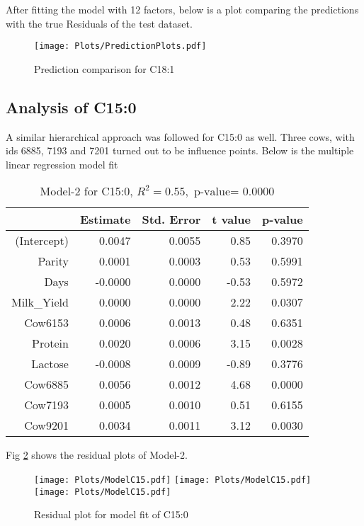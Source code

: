 After fitting the model with 12 factors, below is a plot comparing the predictions with the true Residuals of the test dataset.
\begin{figure}[H]
\begin{center}
\texttt{[image: Plots/PredictionPlots.pdf]}
\end{center}
\caption{Prediction comparison for C18:1}
\label{fig:plsr18}
\end{figure}

\subsection*{Analysis of C15:0}
A similar hierarchical approach was followed for C15:0 as well. Three cows, with ids 6885, 7193 and 7201 turned out to be influence points. Below is the multiple linear regression model fit
\begin{table}[H]
\centering
\begin{tabular}{rrrrr}
  \hline
 & Estimate & Std. Error & t value & p-value \\ 
  \hline
  (Intercept) & 0.0047 & 0.0055 & 0.85 & 0.3970 \\ 
  Parity & 0.0001 & 0.0003 & 0.53 & 0.5991 \\ 
  Days & -0.0000 & 0.0000 & -0.53 & 0.5972 \\ 
  Milk\_Yield & 0.0000 & 0.0000 & 2.22 & 0.0307 \\ 
  Cow6153 & 0.0006 & 0.0013 & 0.48 & 0.6351 \\ 
  Protein & 0.0020 & 0.0006 & 3.15 & 0.0028 \\ 
  Lactose & -0.0008 & 0.0009 & -0.89 & 0.3776 \\ 
  Cow6885 & 0.0056 & 0.0012 & 4.68 & 0.0000 \\ 
  Cow7193 & 0.0005 & 0.0010 & 0.51 & 0.6155 \\ 
  Cow9201 & 0.0034 & 0.0011 & 3.12 & 0.0030 \\ 
  \hline
\end{tabular}
\caption{Model-2 for C15:0, $R^2 = 0.55, \text{ p-value= } 0.0000$}
\label{Tab:Model15}
\end{table}
Fig \ref{fig:Model15} shows the residual plots of Model-2.
\begin{figure}[H]
\begin{center}
\texttt{[image: Plots/ModelC15.pdf]}
\texttt{[image: Plots/ModelC15.pdf]}
\texttt{[image: Plots/ModelC15.pdf]}
\end{center}
\caption{Residual plot for model fit of C15:0}
\label{fig:Model15}
\end{figure}
